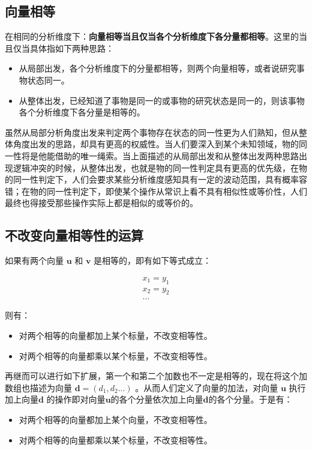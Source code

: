 \documentclass[12pt,oneside]{book}
\begin{document}
\subsection{向量相等}
在相同的分析维度下：\textbf{向量相等当且仅当各个分析维度下各分量都相等}。这里的当且仅当具体指如下两种思路：

\begin{itemize}
\item 从局部出发，各个分析维度下的分量都相等，则两个向量相等，或者说研究事物状态同一。
\item 从整体出发，已经知道了事物是同一的或事物的研究状态是同一的，则该事物各个分析维度下各分量是相等的。
\end{itemize}

虽然从局部分析角度出发来判定两个事物存在状态的同一性更为人们熟知，但从整体角度出发的思路，却具有更高的权威性。当人们要深入到某个未知领域，物的同一性将是他能借助的唯一绳索。当上面描述的从局部出发和从整体出发两种思路出现逻辑冲突的时候，从整体出发，也就是物的同一性判定具有更高的优先级，在物的同一性判定下，人们会要求某些分析维度感知具有一定的波动范围，具有概率容错；在物的同一性判定下，即使某个操作从常识上看不具有相似性或等价性，人们最终也得接受那些操作实际上都是相似的或等价的。

\subsection{不改变向量相等性的运算}
如果有两个向量 $\boldsymbol{u}$ 和 $\boldsymbol{v}$ 是相等的，即有如下等式成立：

\begin{align*}
x_1 = y_1\\
x_2 = y_2\\
...
\end{align*}

则有：

\begin{itemize}
\item 对两个相等的向量都加上某个标量，不改变相等性。
\item 对两个相等的向量都乘以某个标量，不改变相等性。
\end{itemize}

再继而可以进行如下扩展，第一个和第二个加数也不一定是相等的，现在将这个加数组也描述为向量 $\boldsymbol{d} = (d_1, d_2 ...)$ 。从而人们定义了向量的加法，对向量 $\boldsymbol{u}$ 执行加上向量$\boldsymbol{d}$ 的操作即对向量$\boldsymbol{u}$的各个分量依次加上向量$\boldsymbol{d}$的各个分量。于是有：


\begin{itemize}
\item 对两个相等的向量都加上某个向量，不改变相等性。
\item 对两个相等的向量都乘以某个标量，不改变相等性。
\end{itemize}
\end{document}
